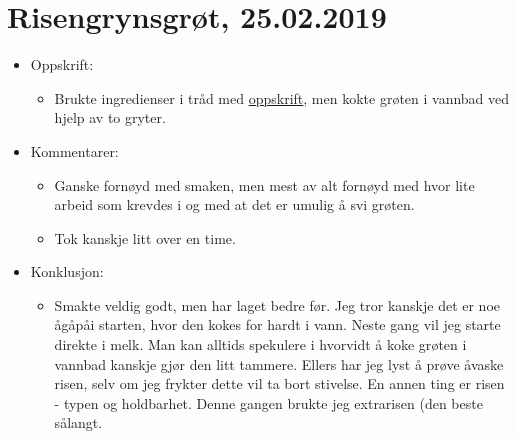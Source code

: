 \documentclass[12pt]{article}
\begin{document}
\section*{Risengrynsgr{\o}t, 25.02.2019}
\begin{itemize}
\item Oppskrift:
  \begin{itemize}
  \item Brukte ingredienser i tr{\aa}d med
    \href{https://www.melk.no/Oppskrifter/Groeter/Tradisjonsgroet/Risengrynsgroet}{oppskrift},
    men kokte gr{\o}ten i vannbad ved hjelp av to gryter. 
  \end{itemize}
\item Kommentarer:
  \begin{itemize}
  \item Ganske forn{\o}yd med smaken, men mest av alt forn{\o}yd med hvor lite arbeid som krevdes i og med at det er umulig å svi gr{\o}ten.
  \item Tok kanskje litt over en time.
  \end{itemize}
\item Konklusjon:
  \begin{itemize}
  \item Smakte veldig godt, men har laget bedre f{\o}r. Jeg tror
    kanskje det er noe \aa g\aa p\aa i starten, hvor den kokes for
    hardt i vann. Neste gang vil jeg starte direkte i melk. Man kan
    alltids spekulere i hvorvidt  å koke gr{\o}ten i vannbad
    kanskje gjør den litt tammere. Ellers har jeg lyst {\aa} pr{\o}ve
    \aa vaske risen, selv om jeg frykter dette vil ta bort
    stivelse. En annen ting er risen - typen og holdbarhet. Denne
    gangen brukte jeg extrarisen (den beste s{\aa}langt.
  \end{itemize}
\end{itemize}
\end{document}
